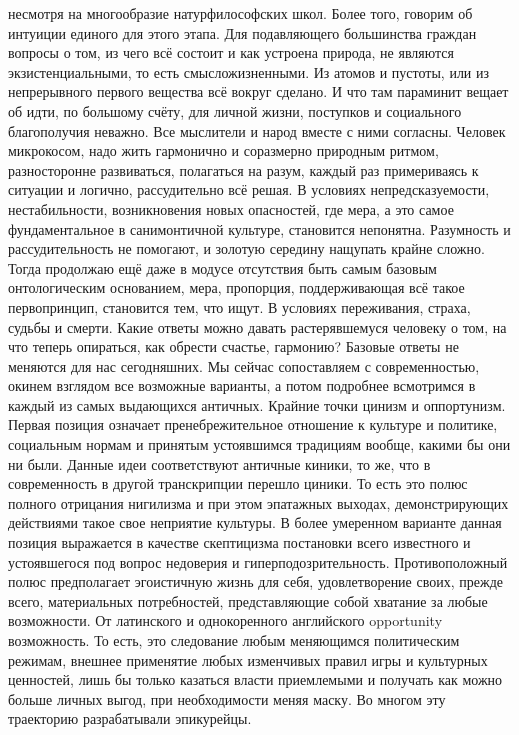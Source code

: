 несмотря на многообразие натурфилософских школ. Более того, говорим об интуиции
единого для этого этапа. Для подавляющего большинства граждан вопросы о том, из
чего всё состоит и как устроена природа, не являются экзистенциальными, то есть
смысложизненными. Из атомов и пустоты, или из непрерывного первого вещества всё
вокруг сделано. И что там параминит вещает об идти, по большому счёту, для
личной жизни, поступков и социального благополучия неважно. Все мыслители и
народ вместе с ними согласны. Человек микрокосом, надо жить гармонично и
соразмерно природным ритмом, разносторонне развиваться, полагаться на разум,
каждый раз примериваясь к ситуации и логично, рассудительно всё решая. В
условиях непредсказуемости, нестабильности, возникновения новых опасностей, где
мера, а это самое фундаментальное в санимонтичной культуре, становится
непонятна. Разумность и рассудительность не помогают, и золотую середину
нащупать крайне сложно. Тогда продолжаю ещё даже в модусе отсутствия быть самым
базовым онтологическим основанием, мера, пропорция, поддерживающая всё такое
первопринцип, становится тем, что ищут. В условиях переживания, страха, судьбы и
смерти. Какие ответы можно давать растерявшемуся человеку о том, на что теперь
опираться, как обрести счастье, гармонию? Базовые ответы не меняются для нас
сегодняшних. Мы сейчас сопоставляем с современностью, окинем взглядом все
возможные варианты, а потом подробнее всмотримся в каждый из самых выдающихся
античных. Крайние точки цинизм и оппортунизм. Первая позиция означает
пренебрежительное отношение к культуре и политике, социальным нормам и принятым
устоявшимся традициям вообще, какими бы они ни были. Данные идеи соответствуют
античные киники, то же, что в современность в другой транскрипции перешло
циники. То есть это полюс полного отрицания нигилизма и при этом эпатажных
выходах, демонстрирующих действиями такое свое неприятие культуры. В более
умеренном варианте данная позиция выражается в качестве скептицизма постановки
всего известного и устоявшегося под вопрос недоверия и гиперподозрительность.
Противоположный полюс предполагает эгоистичную жизнь для себя, удовлетворение
своих, прежде всего, материальных потребностей, представляющие собой хватание за
любые возможности. От латинского и однокоренного английского opportunity
возможность. То есть, это следование любым меняющимся политическим режимам,
внешнее применятие любых изменчивых правил игры и культурных ценностей, лишь бы
только казаться власти приемлемыми и получать как можно больше личных выгод, при
необходимости меняя маску. Во многом эту траекторию разрабатывали эпикурейцы.
